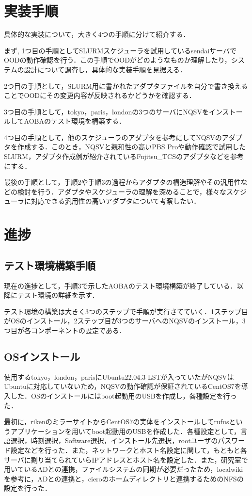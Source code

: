 \documentclass[a4paper,oneside,twocolumn,notitlepage,dvipdfmx]{jsarticle}
\begin{document}
\section{実装手順}
具体的な実装について，大きく4つの手順に分けて紹介する．\par
まず, 1つ目の手順としてSLURMスケジューラを試用しているsendaiサーバでOODの動作確認を行う．この手順でOODがどのようなものか理解したり，システムの設計について調査し，具体的な実装手順を見据える．\par
2つ目の手順として，SLURM用に書かれたアダプタファイルを自分で書き換えることでOODにその変更内容が反映されるかどうかを確認する．\par
3つ目の手順として，tokyo，paris，londonの3つのサーバにNQSVをインストールしてAOBAのテスト環境を構築する．\par
4つ目の手順として，他のスケジューラのアダプタを参考にしてNQSVのアダプタを作成する．このとき，NQSVと親和性の高いPBS Proや動作確認で試用したSLURM，アダプタ作成例が紹介されているFujitsu\_TCSのアダプタなどを参考にする．\par
最後の手順として，手順2や手順3の過程からアダプタの構造理解やその汎用性などの検討を行う．アダプタやスケジューラの理解を深めることで，様々なスケジューラに対応できる汎用性の高いアダプタについて考察したい．

\section{進捗}

\subsection{テスト環境構築手順}
現在の進捗として，手順3で示したAOBAのテスト環境構築が終了している．以降にテスト環境の詳細を示す．\par
テスト環境の構築は大きく3つのステップで手順が実行さてていく．1ステップ目がOSのインストール，2ステップ目が3つのサーバへのNQSVのインストール，3つ目が各コンポーネントの設定である．\par

\subsection{OSインストール}
使用するtokyo，london，parisにUbuntu22.04.3 LSTが入っていたがNQSVはUbuntuに対応していないため，NQSVの動作確認が保証されているCentOS7を導入した．OSのインストールにはboot起動用のUSBを作成し，各種設定を行った．\par
最初に，rikenのミラーサイトからCentOS7の実体をインストールしてrufusというアプリケーションを用いてboot起動用のUSBを作成した．各種設定として，言語選択，時刻選択，Software選択，インストール先選択，rootユーザのパスワード設定などを行った．また，ネットワークとホスト名設定に関して，もともと各サーバに割り当てられていらIPアドレスとホスト名を設定した．また，研究室で用いているADとの連携，ファイルシステムの同期が必要だったため，localwikiを参考に，ADとの連携と，cieroのホームディレクトリと連携するためのNFSの設定を行った．\par
\end{document}
